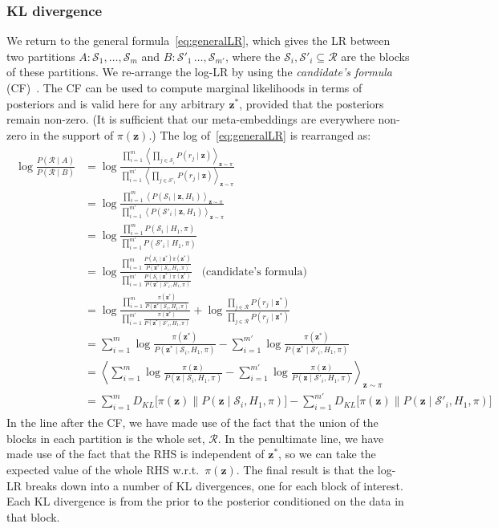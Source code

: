 \documentclass[a4paper,oneside,12pt,english]{report}
\def\zvec{\mathbf{z}}
\def\expvb#1#2{\left\langle#1\right\rangle_{#2}}
\def\KL#1#2{D_{KL}\bigl[#1\|#2\bigr]}
\def\Rset{\mathcal{R}}
\def\Sset{\mathcal{S}}
\begin{document}
\subsubsection{KL divergence}
\label{sec:KLdivLR}
We return to the general formula~\eqref{eq:generalLR}, which gives the LR between two partitions $A:\Sset_1,\ldots,\Sset_m$ and $B:\Sset'_1\,\ldots,\Sset_{m'}$, where the $\Sset_i,\Sset'_i\subseteq\Rset$ are the blocks of these partitions. We re-arrange the log-LR by using the \emph{candidate's formula} (CF)~\cite{cf_besag}. The CF can be used to compute marginal likelihoods in terms of posteriors and is valid here for any arbitrary $\zvec^*$, provided that the posteriors remain non-zero. (It is sufficient that our meta-embeddings are everywhere non-zero in the support of $\pi(\zvec)$.) The log of~\eqref{eq:generalLR} is rearranged as:
\begin{align}
\label{eq:KLdivLR}
\begin{split}
\log\frac{P(\Rset\mid A)}{P(\Rset\mid B)} 
&=\log\frac{\prod_{i=1}^m \expvb{\prod_{j\in\Sset_i} P(r_j\mid\zvec)}{\zvec\sim\pi}}
{\prod_{i=1}^{m'} \expvb{\prod_{j\in\Sset'_i} P(r_j\mid\zvec)}{\zvec\sim\pi}} \\
&=\log\frac{\prod_{i=1}^m \expvb{P(\Sset_i\mid\zvec,H_1)}{\zvec\sim\pi}}
{\prod_{i=1}^{m'} \expvb{P(\Sset'_i\mid\zvec,H_1)}{\zvec\sim\pi}} \\
&=\log\frac{\prod_{i=1}^{m} P(\Sset_i\mid H_1,\pi)}{\prod_{i=1}^{m'} P(\Sset'_i\mid H_1,\pi)} \\
&=\log\frac{\prod_{i=1}^{m} \frac{P(\Sset_i\mid\zvec^*)\pi(\zvec^*)}{P(\zvec^*\mid\Sset_i,H_1,\pi)}}
{\prod_{i=1}^{m'} \frac{P(\Sset_i\mid\zvec^*)\pi(\zvec^*)}{P(\zvec^*\mid\Sset'_i,H_1,\pi)}} \;\;\;\text{(candidate's formula)}\\
&=\log\frac{\prod_{i=1}^{m} \frac{\pi(\zvec^*)}{P(\zvec^*\mid\Sset_i,H_1,\pi)}}
{\prod_{i=1}^{m'} \frac{\pi(\zvec^*)}{P(\zvec^*\mid\Sset'_i,H_1,\pi)}} 
+\log\frac{\prod_{j\in\Rset}P(r_j\mid\zvec^*)}{\prod_{j\in\Rset}P(r_j\mid\zvec^*)} \\
&= \sum_{i=1}^m \log\frac{\pi(\zvec^*)}{P(\zvec^*\mid\Sset_i,H_1,\pi)}
- \sum_{i=1}^{m'} \log\frac{\pi(\zvec^*)}{P(\zvec^*\mid\Sset'_i,H_1,\pi)}\\
&= \expvb{\sum_{i=1}^m \log\frac{\pi(\zvec)}{P(\zvec\mid\Sset_i,H_1,\pi)}
- \sum_{i=1}^{m'} \log\frac{\pi(\zvec)}{P(\zvec\mid\Sset'_i,H_1,\pi)}}{\zvec\sim\pi}\\
&= \sum_{i=1}^m \KL{\pi(\zvec)}{P(\zvec\mid\Sset_i,H_1,\pi)}
- \sum_{i=1}^{m'} \KL{\pi(\zvec)}{P(\zvec\mid\Sset'_i,H_1,\pi)}
\end{split}
\end{align}
In the line after the CF, we have made use of the fact that the union of the blocks in each partition is the whole set, $\Rset$. In the penultimate line, we have made use of the fact that the RHS is independent of $\zvec^*$, so we can take the expected value of the whole RHS w.r.t.\ $\pi(\zvec)$. The final result is that the log-LR breaks down into a number of KL divergences, one for each block of interest. Each KL divergence is from the prior to the posterior conditioned on the data in that block.
\end{document}
